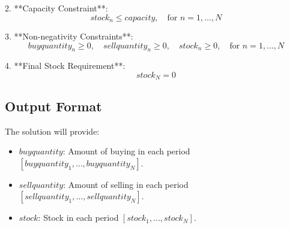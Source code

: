 \documentclass{article}
\begin{document}
2. **Capacity Constraint**:
   \[
   stock_n \leq capacity, \quad \text{for } n = 1, \ldots, N
   \]

3. **Non-negativity Constraints**:
   \[
   buyquantity_n \geq 0, \quad sellquantity_n \geq 0, \quad stock_n \geq 0, \quad \text{for } n = 1, \ldots, N
   \]

4. **Final Stock Requirement**:
   \[
   stock_N = 0
   \]

\subsection*{Output Format}
The solution will provide:
\begin{itemize}
    \item $buyquantity$: Amount of buying in each period $[buyquantity_1, \ldots, buyquantity_N]$.
    \item $sellquantity$: Amount of selling in each period $[sellquantity_1, \ldots, sellquantity_N]$.
    \item $stock$: Stock in each period $[stock_1, \ldots, stock_N]$.
\end{itemize}
\end{document}
